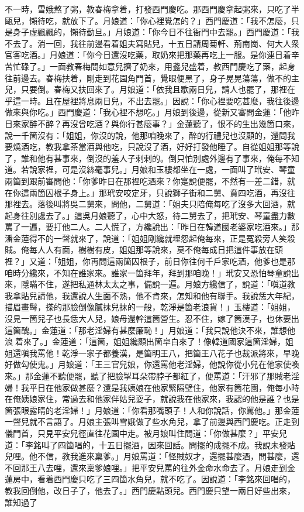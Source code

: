 不一時，雪娥熬了粥，教春梅拿着，打發西門慶吃。那西門慶拿起粥來，只吃了半甌兒，懶待吃，就放下了。月娘道：「你心裡覺怎的？」西門慶道：「我不怎麼，只是身子虛飄飄的，懶待動旦。」{}月娘道：「你今日不往衙門中去罷。」西門慶道：「我不去了。消一回，我往前邊看着姐夫寫貼兒，十五日請周菊軒、荊南崗、何大人衆官客吃酒。」月娘道：「你今日還沒吃藥，取奶來把那藥再吃上一服。是你連日着辛苦忙碌了。」一面教春梅問如意兒擠了奶來，用盞兒盛着，教西門慶吃了藥，起身往前邊去。春梅扶着，剛走到花園角門首，覺眼便黑了，身子晃晃蕩蕩，做不的主兒，只要倒。春梅又扶回來了。月娘道：「依我且歇兩日兒，請人也罷了，那裡在乎這一時。且在屋裡將息兩日兒，不出去罷。」因說：「你心裡要吃甚麼，我往後邊做來與你吃。」西門慶道：「我心裡不想吃。」月娘到後邊，從新又審問金蓮：「他昨日來家醉不醉？再沒曾吃酒？與你行甚麼事？」金蓮聽了，恨不的生出幾箇口來，說一千箇沒有：「姐姐，你沒的說，他那咱晚來了，醉的行禮兒也沒顧的，還問我要燒酒吃，教我拿茶當酒與他吃，只說沒了酒，好好打發他睡了。自從姐姐那等說了，誰和他有甚事來，倒沒的羞人子剌剌的。倒只怕別處外邊有了事來，俺每不知道。若說家裡，可是沒絲毫事兒。」{}月娘和玉樓都坐在一處，一面叫了玳安、琴童兩箇到跟前審問他：「你爹昨日在那裡吃酒來？你寔說便罷，不然有一差二錯，就在你這兩箇囚根子身上。」那玳安咬定牙，只說獅子街和二舅、賁四吃酒，再沒往那裡去。{}落後叫將吳二舅來，問他，二舅道：「姐夫只陪俺每吃了沒多大回酒，就起身往別處去了。」這吳月娘聽了，心中大怒，待二舅去了，把玳安、琴童盡力數罵了一遍，要打他二人。二人慌了，方纔說出：「昨日在韓道國老婆家吃酒來。」那潘金蓮得不的一聲就來了，說道：「姐姐剛纔就埋怨起俺每來，正是冤殺旁人笑殺賊。俺每人人有面，樹樹有皮，姐姐那等說來，莫不俺每成日把這件事放在頭裡？」{}又道：「姐姐，你再問這兩箇囚根子，前日你往何千戶家吃酒，他爹也是那咱時分纔來，不知在誰家來。誰家一箇拜年，拜到那咱晚！」玳安又恐怕琴童說出來，隱瞞不住，遂把私通林太太之事，備說一遍。月娘方纔信了，說道：「嗔道教我拿貼兒請他，我還說人生面不熟，他不肯來，怎知和他有聯手。我說恁大年紀，描眉畫髩，搽的那臉倒像膩抹兒抹的一般，乾淨是箇老浪貨！」玉樓道：「姐姐，沒見一箇兒子也長恁大人兒，娘母還幹這箇營生。忍不住，嫁了箇漢子，也休要出這箇醜。」金蓮道：「那老淫婦有甚麼廉恥！」月娘道：「我只說他決不來，誰想他浪𢵞着來了。」金蓮道：「這箇，姐姐纔顯出箇皁白來了！像韓道國家這箇淫婦，姐姐還嗔我罵他！乾淨一家子都養漢，是箇明王八，把箇王八花子也裁派將來，早晚好做勾使鬼。」月娘道：「王三官兒娘，你還罵他老淫婦，他說你從小兒在他家使喚來。」{}那金蓮不聽便罷，聽了把臉掣耳朵帶脖子都紅了，{}{}便罵道：「汗邪了那賊老淫婦！我平日在他家做甚麼？還是我姨娘在他家緊隔壁住，他家有箇花園，俺每小時在俺姨娘家住，常過去和他家伴姑兒耍子，就說我在他家來，我認的他是誰？也是箇張眼露睛的老淫婦！」月娘道：「你看那嘴頭子！人和你說話，你罵他。」那金蓮一聲兒就不言語了。月娘主張叫雪娥做了些水角兒，拿了前邊與西門慶吃。正走到儀門首，只見平安兒徑直往花園中走。被月娘叫住問道：「你做甚麼？」平安兒道：「李銘叫了四箇唱的，十五日擺酒，因來回話。問擺的成擺不成。我說未發貼兒哩。他不信，教我進來稟爹。」月娘罵道：「怪賊奴才，還擺甚麼酒，問甚麼，還不回那王八去哩，還來稟爹娘哩。」把平安兒罵的往外金命水命去了。月娘走到金蓮房中，看着西門慶只吃了三四箇水角兒，就不吃了。因說道：「李銘來回唱的，教我回倒他，改日子了，他去了。」西門慶點頭兒。西門慶只望一兩日好些出來，誰知過了